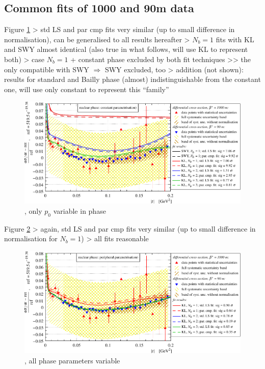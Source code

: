 \> 



\subsection{Common fits of 1000 and 90m data}

\> Figure \ref{fig:fits common con}
\>> std LS and par cmp fits very similar (up to small difference in normalisation), can be generalised to all results hereafter
\>> $N_b = 1$ fits with KL and SWY almost identical (also true in what follows, will use KL to represent both)
\>> case $N_b = 1$ + constant phase excluded by both fit techniques
\>>> the only compatible with SWY $\Rightarrow$ SWY excluded, too
\>> addition (not shown): results for standard and Bailly phase (almost) indistinguishable from the constant one, will use only constant to represent this ``family''

\begin{figure}
\begin{center}
\includegraphics{fig/fits_common_con.pdf}
\caption{, only $p_0$ variable in phase}
\label{fig:fits common con}
\end{center}
\end{figure}

\> Figure \ref{fig:fits common per}
\>> again, std LS and par cmp fits very similar (up to small difference in normalisation for $N_b = 1$)
\>> all fits reasonable

\begin{figure}
\begin{center}
\includegraphics{fig/fits_common_per.pdf}
\caption{, all phase parameters variable}
\label{fig:fits common per}
\end{center}
\end{figure}

